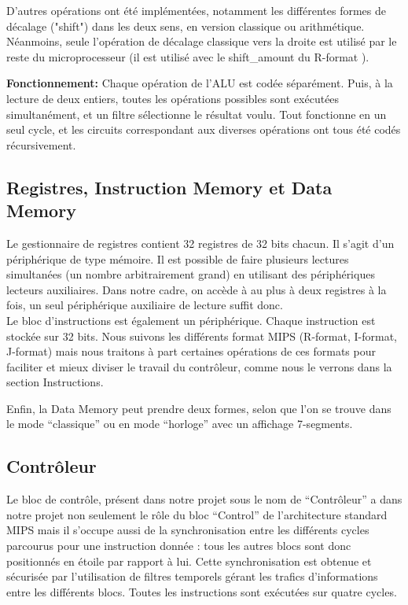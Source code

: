 \documentclass[13pt]{article}
\begin{document}
D'autres opérations ont été implémentées, notamment les différentes formes de
décalage ("shift") dans les deux sens, en version classique ou arithmétique.
Néanmoins, seule l'opération de décalage classique vers la droite est utilisé par le
reste du microprocesseur (il est utilisé avec le shift\_amount du R-format ).

\textbf{Fonctionnement:} Chaque opération de l’ALU est codée séparément.
Puis, à la lecture de deux entiers, toutes les opérations possibles sont exécutées
simultanément, et un filtre sélectionne le résultat voulu. Tout fonctionne en un
seul cycle, et les circuits correspondant aux diverses opérations ont tous été
codés récursivement.

\subsection{Registres, Instruction Memory et Data Memory } 

Le gestionnaire de registres contient 32 registres de 32 bits chacun.
Il s'agit d'un périphérique de type mémoire. Il est possible de faire plusieurs
lectures simultanées (un nombre arbitrairement grand) en utilisant des périphériques
lecteurs auxiliaires. Dans notre cadre, on accède à au plus à deux registres à la fois, un seul 
périphérique auxiliaire de lecture suffit donc. \\

Le bloc d'instructions est également un périphérique. Chaque instruction est stockée
sur 32 bits. Nous suivons les différents format MIPS (R-format, I-format, J-format) mais
nous traitons à part certaines opérations de ces formats pour faciliter 
et mieux diviser le travail du 
contrôleur, comme nous le verrons dans la section Instructions.

Enfin, la Data Memory peut prendre deux formes, selon que l'on se trouve dans le
mode ``classique'' ou en mode ``horloge'' avec un affichage 7-segments. 

\subsection{Contrôleur}

Le bloc de contrôle, présent dans notre projet sous le nom de ``Contrôleur'' a
dans notre projet non seulement le rôle du bloc ``Control'' de l’architecture
standard MIPS mais il s’occupe aussi de la synchronisation entre les différents
cycles parcourus pour une instruction donnée : tous les autres blocs sont donc
positionnés en étoile par rapport à lui. Cette synchronisation est obtenue et
sécurisée par l’utilisation de filtres temporels gérant les trafics
d’informations entre les différents blocs. Toutes les instructions sont
exécutées sur quatre cycles.
\end{document}
